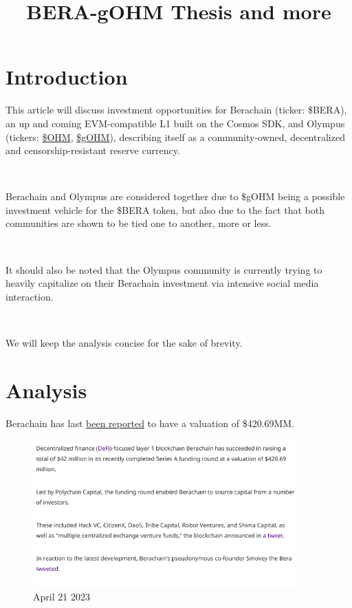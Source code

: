 \documentclass{article}
\title{BERA-gOHM Thesis and more}
\begin{document}
\maketitle
\section{Introduction}
This article will discuss investment opportunities for Berachain (ticker: \$BERA), an up and coming EVM-compatible L1 built on the Cosmos SDK, and Olympus (tickers: \href{https://dexscreener.com/ethereum/0x893f503fac2ee1e5b78665db23f9c94017aae97d}{\$OHM}, \href{https://dexscreener.com/ethereum/0x08f68110f1e0ca67c80a24b4bd206675610f445d}{\$gOHM}), describing itself as a community-owned, decentralized and censorship-resistant reserve currency.

\

Berachain and Olympus are considered together due to \$gOHM being a possible investment vehicle for the \$BERA token, but also due to the fact that both communities are shown to be tied one to another, more or less.

\

It should also be noted that the Olympus community is currently trying to heavily capitalize on their Berachain investment via intensive social media interaction.

\

We will keep the analysis concise for the sake of brevity.

\newpage
\section{Analysis}

Berachain has last \href{https://cryptonews.com/news/berachain-secures-42-million-series-a-at-42069m-valuation-boosting-defi-focused-layer-1.htm}{been reported} to have a valuation of \$420.69MM.

\begin{figure}[h]
    \centering
    \includegraphics[width=0.9\textwidth]{valuation.png}
    \caption{April 21 2023}
\end{figure}
\end{document}
